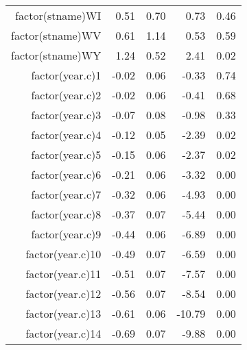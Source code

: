 \begin{table}[ht]
\begin{tabular}{rrrrr}
  factor(stname)WI & 0.51 & 0.70 & 0.73 & 0.46 \\ 
  factor(stname)WV & 0.61 & 1.14 & 0.53 & 0.59 \\ 
  factor(stname)WY & 1.24 & 0.52 & 2.41 & 0.02 \\ 
  factor(year.c)1 & -0.02 & 0.06 & -0.33 & 0.74 \\ 
  factor(year.c)2 & -0.02 & 0.06 & -0.41 & 0.68 \\ 
  factor(year.c)3 & -0.07 & 0.08 & -0.98 & 0.33 \\ 
  factor(year.c)4 & -0.12 & 0.05 & -2.39 & 0.02 \\ 
  factor(year.c)5 & -0.15 & 0.06 & -2.37 & 0.02 \\ 
  factor(year.c)6 & -0.21 & 0.06 & -3.32 & 0.00 \\ 
  factor(year.c)7 & -0.32 & 0.06 & -4.93 & 0.00 \\ 
  factor(year.c)8 & -0.37 & 0.07 & -5.44 & 0.00 \\ 
  factor(year.c)9 & -0.44 & 0.06 & -6.89 & 0.00 \\ 
  factor(year.c)10 & -0.49 & 0.07 & -6.59 & 0.00 \\ 
  factor(year.c)11 & -0.51 & 0.07 & -7.57 & 0.00 \\ 
  factor(year.c)12 & -0.56 & 0.07 & -8.54 & 0.00 \\ 
  factor(year.c)13 & -0.61 & 0.06 & -10.79 & 0.00 \\ 
  factor(year.c)14 & -0.69 & 0.07 & -9.88 & 0.00 \\ 
   \hline
\end{tabular}
\end{table}
